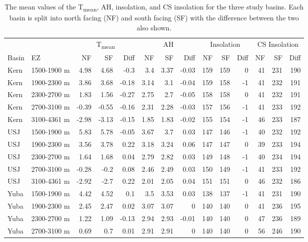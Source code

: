 \begin{table}[htbp]
\centering
\caption{The mean values of the T\textsubscript{mean}, AH, insolation, and CS insolation for the three study basins. Each basin is split into north facing (NF) and south facing (SF) with the difference between the two also shown.}
\label{tab:met_metric_table}
\tiny 
\begin{tabular}{llrrrrrrrrrrrr}
\toprule
& & \multicolumn{3}{c}{T\textsubscript{mean}} & \multicolumn{3}{c}{AH} & \multicolumn{3}{c}{Insolation} & \multicolumn{3}{c}{CS Insolation} \\
\cmidrule(c){3-5} \cmidrule(lr){6-8} \cmidrule(lr){9-11} \cmidrule(lr){12-14} 
Basin & EZ & NF & SF & Diff & NF & SF & Diff & NF & SF & Diff & NF & SF & Diff \\
\midrule
Kern & 1500-1900 m & 4.98 & 4.68 & -0.3 & 3.4 & 3.37 & -0.03 & 159 & 159 & 0 & 41 & 231 & 190 \\
Kern & 1900-2300 m & 3.86 & 3.68 & -0.18 & 3.14 & 3.1 & -0.04 & 159 & 158 & -1 & 41 & 232 & 191 \\
Kern & 2300-2700 m & 1.83 & 1.56 & -0.27 & 2.75 & 2.7 & -0.05 & 158 & 158 & 0 & 41 & 232 & 191 \\
Kern & 2700-3100 m & -0.39 & -0.55 & -0.16 & 2.31 & 2.28 & -0.03 & 157 & 156 & -1 & 41 & 233 & 192 \\
Kern & 3100-4361 m & -2.98 & -3.13 & -0.15 & 1.85 & 1.83 & -0.02 & 155 & 154 & -1 & 46 & 233 & 187 \\
USJ & 1500-1900 m & 5.83 & 5.78 & -0.05 & 3.67 & 3.7 & 0.03 & 147 & 146 & -1 & 40 & 232 & 192 \\
USJ & 1900-2300 m & 3.56 & 3.78 & 0.22 & 3.18 & 3.24 & 0.06 & 147 & 147 & 0 & 39 & 233 & 194 \\
USJ & 2300-2700 m & 1.64 & 1.68 & 0.04 & 2.79 & 2.82 & 0.03 & 149 & 148 & -1 & 40 & 234 & 194 \\
USJ & 2700-3100 m & -0.28 & -0.2 & 0.08 & 2.46 & 2.49 & 0.03 & 150 & 149 & -1 & 41 & 233 & 192 \\
USJ & 3100-4361 m & -2.92 & -2.7 & 0.22 & 2.01 & 2.05 & 0.04 & 151 & 151 & 0 & 46 & 232 & 186 \\
Yuba & 1500-1900 m & 4.42 & 4.52 & 0.1 & 3.5 & 3.53 & 0.03 & 138 & 137 & -1 & 41 & 231 & 190 \\
Yuba & 1900-2300 m & 2.45 & 2.47 & 0.02 & 3.07 & 3.07 & 0 & 140 & 140 & 0 & 41 & 236 & 195 \\
Yuba & 2300-2700 m & 1.22 & 1.09 & -0.13 & 2.94 & 2.93 & -0.01 & 140 & 140 & 0 & 47 & 236 & 189 \\
Yuba & 2700-3100 m & 0.69 & 0.7 & 0.01 & 2.91 & 2.91 & 0 & 140 & 140 & 0 & 56 & 246 & 190 \\
\bottomrule
\end{tabular}
\end{table}


